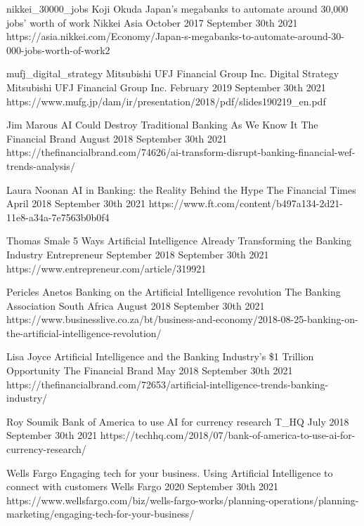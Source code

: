 \begin{thebibliography}{100}
\onlinebibitem
{nikkei_30000_jobs}
{Koji Okuda}
{Japan's megabanks to automate around 30,000 jobs' worth of work}
{Nikkei Asia}
{October 2017}
{September 30th 2021}
{https://asia.nikkei.com/Economy/Japan-s-megabanks-to-automate-around-30-000-jobs-worth-of-work2}

\onlinebibitem
{mufj_digital_strategy}
{Mitsubishi UFJ Financial Group Inc.}
{Digital Strategy}
{Mitsubishi UFJ Financial Group Inc.}
{February 2019}
{September 30th 2021}
{https://www.mufg.jp/dam/ir/presentation/2018/pdf/slides190219\_en.pdf}

{Jim Marous}
{AI Could Destroy Traditional Banking As We Know It}
{The Financial Brand}
{August 2018}
{September 30th 2021}
{https://thefinancialbrand.com/74626/ai-transform-disrupt-banking-financial-wef-trends-analysis/}

{Laura Noonan}
{AI in Banking: the Reality Behind the Hype}
{The Financial Times}
{April 2018}
{September 30th 2021}
{https://www.ft.com/content/b497a134-2d21-11e8-a34a-7e7563b0b0f4}

{Thomas Smale}
{5 Ways Artificial Intelligence Already Transforming the Banking Industry}
{Entrepreneur}
{September 2018}
{September 30th 2021}
{https://www.entrepreneur.com/article/319921}

{Pericles Anetos}
{Banking on the Artificial Intelligence revolution}
{The Banking Association South Africa}
{August 2018}
{September 30th 2021}
{https://www.businesslive.co.za/bt/business-and-economy/2018-08-25-banking-on-the-artificial-intelligence-revolution/}

{Lisa Joyce}
{Artificial Intelligence and the Banking Industry’s \$1 Trillion Opportunity}
{The Financial Brand}
{May 2018}
{September 30th 2021}
{https://thefinancialbrand.com/72653/artificial-intelligence-trends-banking-industry/}

{Roy Soumik}
{Bank of America to use AI for currency research}
{T\_HQ}
{July 2018}
{September 30th 2021}
{https://techhq.com/2018/07/bank-of-america-to-use-ai-for-currency-research/}

{Wells Fargo}
{Engaging tech for your business. Using Artificial Intelligence to connect with customers}
{Wells Fargo}
{2020}
{September 30th 2021}
{https://www.wellsfargo.com/biz/wells-fargo-works/planning-operations/planning-marketing/engaging-tech-for-your-business/}


\end{thebibliography}
